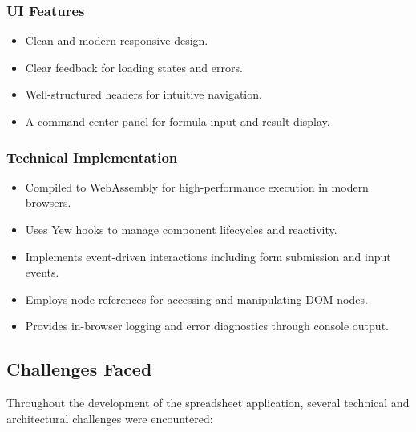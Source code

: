 \subsubsection{UI Features}

\begin{itemize}
    \item Clean and modern responsive design.
    \item Clear feedback for loading states and errors.
    \item Well-structured headers for intuitive navigation.
    \item A command center panel for formula input and result display.
\end{itemize}

\subsubsection{Technical Implementation}

\begin{itemize}
    \item Compiled to WebAssembly for high-performance execution in modern browsers.
    \item Uses Yew hooks to manage component lifecycles and reactivity.
    \item Implements event-driven interactions including form submission and input events.
    \item Employs node references for accessing and manipulating DOM nodes.
    \item Provides in-browser logging and error diagnostics through console output.
\end{itemize}

\subsection{Challenges Faced}

Throughout the development of the spreadsheet application, several technical and architectural challenges were encountered:


